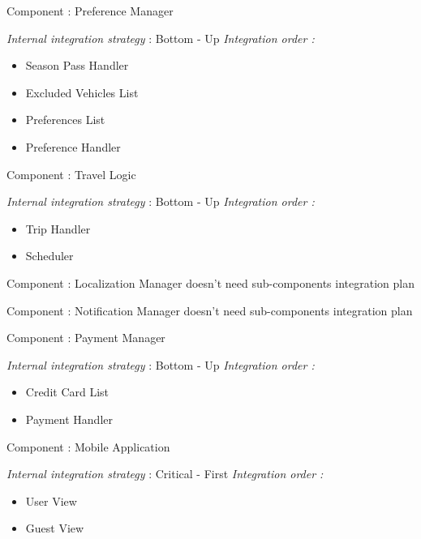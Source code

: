 Component : Preference Manager

\textit{Internal integration strategy} : Bottom - Up
\textit{Integration order :}
	\begin{itemize}
		\item Season Pass Handler
		\item Excluded Vehicles List
		\item Preferences List
		\item Preference Handler
	\end{itemize}
	

Component : Travel Logic

\textit{Internal integration strategy} : Bottom - Up
\textit{Integration order :}
	\begin{itemize}
		\item Trip Handler
		\item Scheduler
	\end{itemize}
	
Component : Localization Manager doesn't need sub-components integration plan

Component : Notification Manager doesn't need sub-components integration plan

Component : Payment Manager

\textit{Internal integration strategy} : Bottom - Up
\textit{Integration order :}
	\begin{itemize}
		\item Credit Card List
		\item Payment Handler
	\end{itemize}

Component : Mobile Application

\textit{Internal integration strategy} : Critical - First
\textit{Integration order :}
	\begin{itemize}
		\item User View
		\item Guest View
	\end{itemize}
	